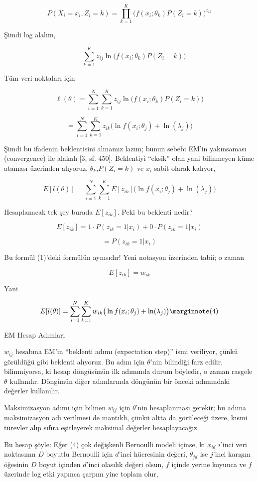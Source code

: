 \documentclass[12pt,fleqn]{article}\usepackage{../../common}
\begin{document}
$$  P(X_i = x_i, Z_i=k) =  
\prod_{k=1}^{K} \big( f(x_i;\theta_k)P(Z_i=k) \big)^{z_{ik}} $$

Şimdi log alalım, 

$$  = \sum_{k=1}^{K} z_{ij} \ln \big( f(x_i;\theta_k)P(Z_i=k) \big) $$

Tüm veri noktaları için

$$  \ell(\theta) = 
\sum_{i=1}^{N} \sum_{k=1}^{K} z_{ij} \ln \big( f(x_i;\theta_k)P(Z_i=k) \big) $$

$$ 
= \sum_{i=1}^{N} \sum_{k=1}^{K} z_{ik} 
\big( \ln f(x_i;\theta_j) + \ln(\lambda_j) \big)   
$$

Şimdi bu ifadenin beklentisini almamız lazım; bunun sebebi EM'in yakınsaması
(convergence) ile alakalı [3, sf. 450]. Beklentiyi ``eksik'' olan yani
bilinmeyen küme ataması üzerinden alıyoruz, $\theta_k$,$P(Z_i=k)$ ve $x_i$ sabit
olarak kalıyor,

$$ 
E[l(\theta)] = \sum_{i=1}^{N} \sum_{k=1}^{K} E[z_{ik}]
\big( \ln f(x_i;\theta_j) + \ln(\lambda_j) \big)   
$$

Hesaplanacak tek şey burada $E[z_{ik}]$. Peki bu beklenti nedir? 

$$ E[z_{ik}] = 1 \cdot P(z_{ik}=1 | x_i) + 0 \cdot P(z_{ik}=1 | x_i)  $$

$$=  P(z_{ik}=1 | x_i)  $$

Bu formül (1)'deki formülün aynısıdır! Yeni notasyon üzerinden tabii; o
zaman 

$$  E[z_{ik}] = w_{ik} $$

Yani

$$ 
E[l(\theta)] = \sum_{i=1}^{N} \sum_{k=1}^{K} w_{ik}
\big( \ln f(x_i;\theta_j) + \ln(\lambda_j) \big) 
\mlabel{4}
$$

EM Hesap Adımları

$w_{ij}$ hesabına EM'in ``beklenti adımı (expectation step)'' ismi veriliyor,
çünkü görüldüğü gibi beklenti alıyoruz. Bu adım için $\theta$'nin bilindiği farz
edilir, bilinmiyorsa, ki hesap döngüsünün ilk adımında durum böyledir, o zaman
rasgele $\theta$ kullanılır. Döngünün diğer adımlarında döngünün bir önceki
adımındaki değerler kullanılır.

Maksimizasyon adımı için bilinen $w_{ij}$ için $\theta$'nin hesaplanması
gerekir; bu adıma maksimizasyon adı verilmesi de mantıklı, çünkü altta da
görüleceği üzere, kısmi türevler alıp sıfıra eşitleyerek maksimal değerler
hesaplayacağız.

Bu hesap şöyle: Eğer (4) çok değişkenli Bernoulli modeli içinse, ki $x_{id}$
$i$'inci veri noktasının $D$ boyutlu Bernoulli için $d$'inci hücresinin değeri,
$\theta_{jd}$ ise $j$'inci karışım öğesinin $D$ boyut içinden $d$'inci olasılık
değeri olsun, $f$ içinde yerine koyunca ve $f$ üzerinde log etki yapınca çarpım
yine toplam olur,
\end{document}
